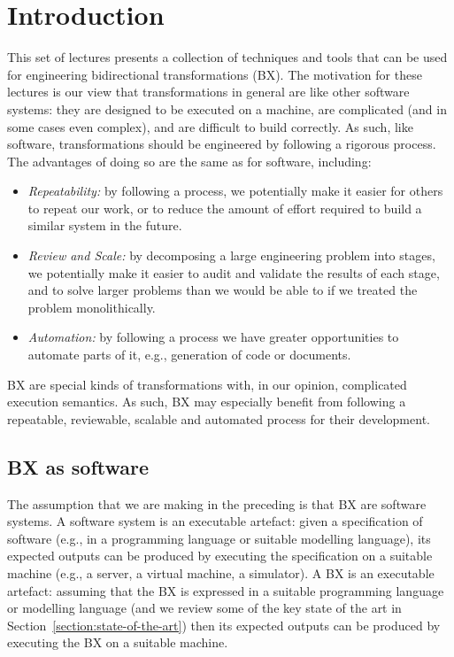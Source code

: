 \section{Introduction}
\label{section:introduction}

This set of lectures presents a collection of techniques and tools that can be used for engineering bidirectional transformations (BX). The motivation for these lectures is our view that transformations in general are like other software systems: they are designed to be executed on a machine, are complicated (and in some cases even complex), and are difficult to build correctly. As such, like software, transformations should be engineered by following a rigorous process. The advantages of doing so are the same as for software, including:
\begin{itemize}
\item \textit{Repeatability:} by following a process, we potentially make it easier for others to repeat our work, or to reduce the amount of effort required to build a similar system in the future.
\item \textit{Review and Scale:} by decomposing a large engineering problem into stages, we potentially make it easier to audit and validate the results of each stage, and to solve larger problems than we would be able to if we treated the problem monolithically.
\item \textit{Automation:} by following a process we have greater opportunities to automate parts of it, e.g., generation of code or documents. 
\end{itemize}
BX are special kinds of transformations with, in our opinion, complicated execution semantics. As such, BX may especially benefit from following a repeatable, reviewable, scalable and automated process for their development.

\subsection{BX as software}
The assumption that we are making in the preceding is that BX are software systems. A software system is an executable artefact: given a specification of software (e.g., in a programming language or suitable modelling language), its expected outputs can be produced by executing the specification on a suitable machine (e.g., a server, a virtual machine, a simulator). A BX is an executable artefact: assuming that the BX is expressed in a suitable programming language or modelling language (and we review some of the key state of the art in Section~\ref{section:state-of-the-art}) then its expected outputs can be produced by executing the BX on a suitable machine. 

